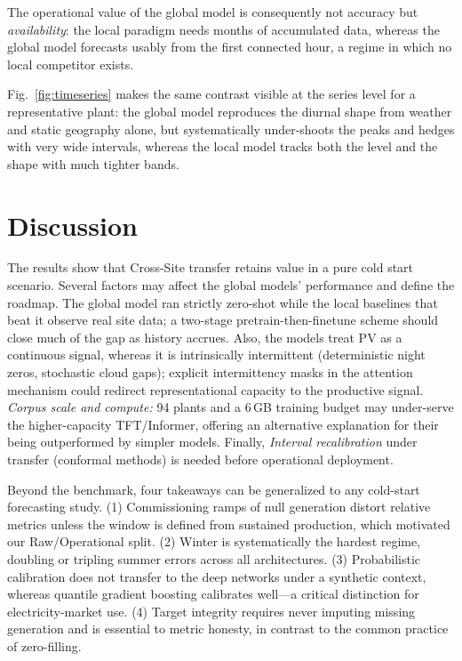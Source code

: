\documentclass[conference]{IEEEtran}
\begin{document}
The operational value of the global model is consequently not accuracy but
\emph{availability}: the local paradigm needs months of accumulated data, whereas the global
model forecasts usably from the first connected hour, a regime in which no local competitor
exists.

Fig.~\ref{fig:timeseries} makes the same contrast visible at the series level for a
representative plant: the global model reproduces the diurnal shape from weather and static
geography alone, but systematically under-shoots the peaks and hedges with very wide
intervals, whereas the local model tracks both the level and the shape with much tighter
bands.

\section{Discussion}
The results show that Cross-Site transfer retains value in a pure cold start scenario. Several factors may affect the
global models' performance and define the roadmap. The global model
ran strictly zero-shot while the local baselines that beat it observe real site data; a
two-stage pretrain-then-finetune scheme should close much of the gap as history accrues.
Also, the models treat PV as a continuous signal, whereas
it is intrinsically intermittent (deterministic night zeros, stochastic cloud gaps);
explicit intermittency masks in the attention mechanism could redirect representational
capacity to the productive signal. \emph{Corpus scale and compute:} 94 plants and a 6\,GB
training budget may under-serve the higher-capacity TFT/Informer, offering an alternative
explanation for their being outperformed by simpler models. Finally, \emph{Interval recalibration}
under transfer (conformal methods) is needed before operational deployment.

Beyond the benchmark, four takeaways can be generalized
to any cold-start forecasting study. (1) Commissioning ramps of null generation distort
relative metrics unless the window is defined from sustained production, which motivated our
Raw/Operational split. (2) Winter is systematically the hardest regime, doubling or tripling
summer errors across all architectures. (3) Probabilistic calibration does not transfer to
the deep networks under a synthetic context, whereas quantile gradient boosting calibrates
well---a critical distinction for electricity-market use. (4) Target integrity requires never
imputing missing generation and is essential to metric honesty, in contrast to the common
practice of zero-filling.
\end{document}
